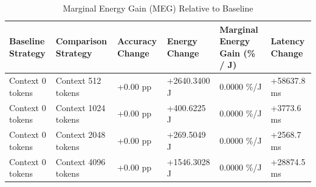 \begin{table}
\caption{Marginal Energy Gain (MEG) Relative to Baseline}
\label{tab:marginal_energy_gain}
\begin{tabular}{llllll}
\toprule
Baseline Strategy & Comparison Strategy & Accuracy Change & Energy Change & Marginal Energy Gain (\% / J) & Latency Change \\
\midrule
Context 0 tokens & Context 512 tokens & +0.00 pp & +2640.3400 J & 0.0000 \%/J & +58637.8 ms \\
Context 0 tokens & Context 1024 tokens & +0.00 pp & +400.6225 J & 0.0000 \%/J & +3773.6 ms \\
Context 0 tokens & Context 2048 tokens & +0.00 pp & +269.5049 J & 0.0000 \%/J & +2568.7 ms \\
Context 0 tokens & Context 4096 tokens & +0.00 pp & +1546.3028 J & 0.0000 \%/J & +28874.5 ms \\
\bottomrule
\end{tabular}
\end{table}
